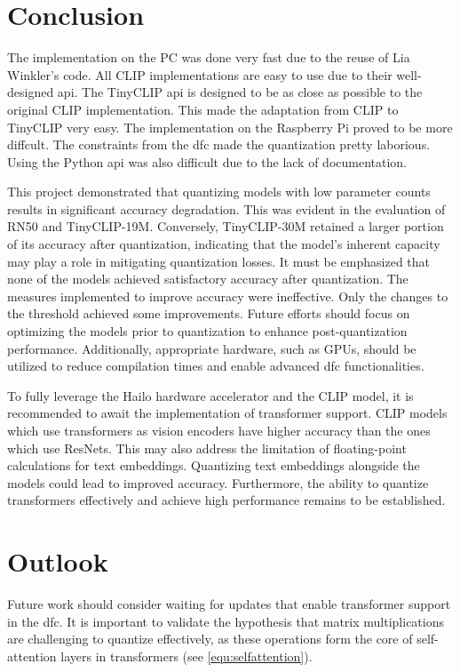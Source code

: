 \section{Conclusion}
The implementation on the PC was done very fast due to the reuse of Lia Winkler's code.
All CLIP implementations are easy to use due to their well-designed \acrshort{api}.
The TinyCLIP \acrshort{api} is designed to be as close as possible to the original CLIP implementation.
This made the adaptation from CLIP to TinyCLIP very easy.
The implementation on the Raspberry Pi proved to be more diffcult.
The constraints from the \acrshort{dfc} made the quantization pretty laborious.
Using the Python \acrshort{api} was also difficult due to the lack of documentation.

This project demonstrated that quantizing models with low parameter counts results in significant accuracy degradation.
This was evident in the evaluation of RN50 and TinyCLIP-19M.  
Conversely, TinyCLIP-30M retained a larger portion of its accuracy after quantization, indicating that the model's inherent capacity may play a role in mitigating quantization losses.  
It must be emphasized that none of the models achieved satisfactory accuracy after quantization.  
The measures implemented to improve accuracy were ineffective.
Only the changes to the threshold achieved some improvements. 
Future efforts should focus on optimizing the models prior to quantization to enhance post-quantization performance.  
Additionally, appropriate hardware, such as GPUs, should be utilized to reduce compilation times and enable advanced \acrshort{dfc} functionalities.  

To fully leverage the Hailo hardware accelerator and the CLIP model, it is recommended to await the implementation of transformer support.
CLIP models which use transformers as vision encoders have higher accuracy than the ones which use ResNets. 
This may also address the limitation of floating-point calculations for text embeddings.  
Quantizing text embeddings alongside the models could lead to improved accuracy.  
Furthermore, the ability to quantize transformers effectively and achieve high performance remains to be established.  

\section{Outlook}  
Future work should consider waiting for updates that enable transformer support in the \acrshort{dfc}.  
It is important to validate the hypothesis that matrix multiplications are challenging to quantize effectively, as these operations form the core of self-attention layers in transformers (see \cref{equ:selfattention}).  


